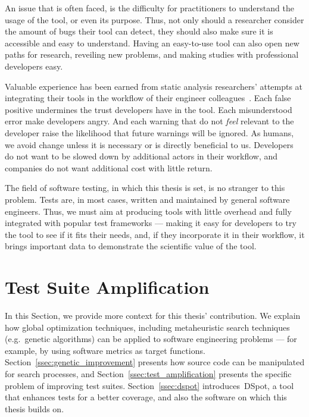 \documentclass[a4paper,11pt]{sdm_internship}
\newcommand{\dspot}{DSpot\xspace}
\theoremstyle{definition}
\begin{document}
An issue that is often faced, is the difficulty for practitioners to understand the usage of the tool, or even its purpose.
Thus, not only should a researcher consider the amount of bugs their tool can detect, they should also make sure it is accessible and easy to understand.
Having an easy-to-use tool can also open new paths for research, reveiling new problems, and making studies with professional developers easy.

Valuable experience has been earned from static analysis researchers' attempts at integrating their tools in the workflow of their engineer colleagues~\cite{bessey2010few,sadowski2015tricorder,sadowski2018lessons}.
Each false positive undermines the trust developers have in the tool.
Each misunderstood error make developers angry.
And each warning that do not \emph{feel} relevant to the developer raise the likelihood that future warnings will be ignored.
As humans, we avoid change unless it is necessary or is directly beneficial to us.
Developers do not want to be slowed down by additional actors in their workflow, and companies do not want additional cost with little return.

The field of software testing, in which this thesis is set, is no stranger to this problem.
Tests are, in most cases, written and maintained by general software engineers.
Thus, we must aim at producing tools with little overhead and fully integrated with popular test frameworks --- making it easy for developers to try the tool to see if it fits their needs, and, if they incorporate it in their workflow, it brings important data to demonstrate the scientific value of the tool.


\section{Test Suite Amplification}%
\label{sec:test_suite_amplification}
In this Section, we provide more context for this thesis' contribution.
We explain how global optimization techniques, including metaheuristic search techniques (e.g.\ genetic algorithms) can be applied to software engineering problems --- for example, by using software metrics as target functions.
Section~\ref{ssec:genetic_improvement} presents how source code can be manipulated for search processes, and Section~\ref{ssec:test_amplification} presents the specific problem of improving test suites.
Section~\ref{ssec:dspot} introduces~\dspot{}, a tool that enhances tests for a better coverage, and also the software on which this thesis builds on.
\end{document}
